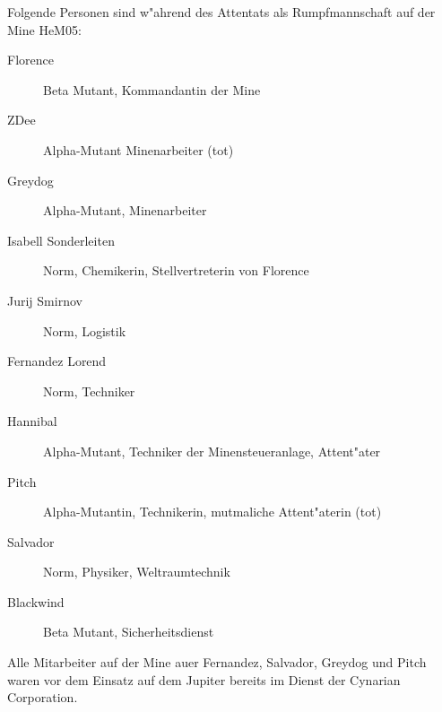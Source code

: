 
Folgende Personen sind w"ahrend des Attentats als Rumpfmannschaft auf der Mine HeM05:

\begin{description}
    \item[Florence] Beta Mutant, Kommandantin der Mine    
    \item[ZDee] Alpha-Mutant Minenarbeiter (tot)
    \item[Greydog] Alpha-Mutant, Minenarbeiter
    \item[Isabell Sonderleiten] Norm, Chemikerin, Stellvertreterin von Florence
    \item[Jurij Smirnov] Norm, Logistik
    \item[Fernandez Lorend] Norm, Techniker
    \item[Hannibal] Alpha-Mutant, Techniker der Minensteueranlage, Attent"ater
    \item[Pitch] Alpha-Mutantin, Technikerin, mutma\3liche Attent"aterin (tot)
    \item[Salvador] Norm, Physiker, Weltraumtechnik
    \item[Blackwind] Beta Mutant, Sicherheitsdienst
\end{description}

Alle Mitarbeiter auf der Mine au\3er Fernandez, Salvador, Greydog und Pitch waren vor dem Einsatz auf dem Jupiter bereits im Dienst der Cynarian Corporation.